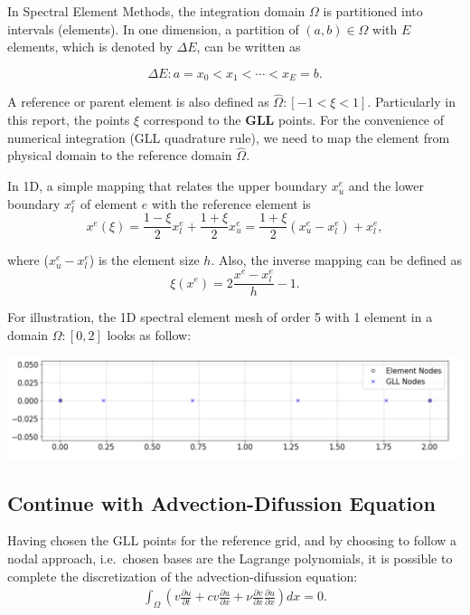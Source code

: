 \documentclass[
  a4paper,
  10pt]{article}
\begin{document}
In Spectral Element Methods, the integration domain \(\Omega\) is
partitioned into intervals (elements). In one dimension, a partition of $(a,b) \in \Omega$ with $E$ elements, which is denoted by $\Delta{E}$, can be written as

\begin{equation}
    \Delta{E} : a=x_0<x_1< \cdots < x_E =b.
\end{equation}

A reference or parent element is also defined as
\(\hat{\Omega}:[-1 < \xi < 1]\). Particularly in this report, the points
\(\xi\) correspond to the \textbf{GLL} points. For
the convenience of numerical integration (GLL quadrature rule), we need to
map the element from physical domain to the reference domain
\(\hat{\Omega}\).

In 1D, a simple mapping that relates the upper boundary \(x^{e}_u\) and
the lower boundary \(x^{e}_l\) of element \(e\) with the reference
element is \begin{equation}
    x^{e}(\xi) = \frac{1-\xi}{2}x^{e}_l+ \frac{1+\xi}{2}x^{e}_u = \frac{1+\xi}{2}(x^{e}_u-x^{e}_l)+x^{e}_l,
\end{equation}

where (\(x^{e}_u-x^{e}_l\)) is the element size \(h\). Also, the inverse mapping can be defined as \begin{equation}
    \xi(x^{e}) = 2\frac{x^{e}-x^{e}_l}{h}-1.
\end{equation}

For illustration, the 1D spectral element mesh of order 5 with 1 element
in a domain \(\Omega:[0,2]\) looks as follow:

\includegraphics{figs/3bfea2e0211dfcbedca0466bd0dc58b20c68d586.png}

\hypertarget{continue-with-advectiondifussion.}{%
\subsection{Continue with
Advection-Difussion Equation}\label{continue-with-advectiondifussion.}}

Having chosen the GLL points for the reference grid, and by
choosing to follow a nodal approach, i.e.~chosen bases are the Lagrange
polynomials, it is possible to complete the discretization of the
advection-difussion equation: \begin{align}
\int_{\Omega} (v\frac{\partial u}{\partial t} + cv\frac{\partial u}{\partial x} + \nu\frac{\partial v}{\partial x}\frac{\partial u}{\partial x})dx = 0.
\end{align}
\end{document}

